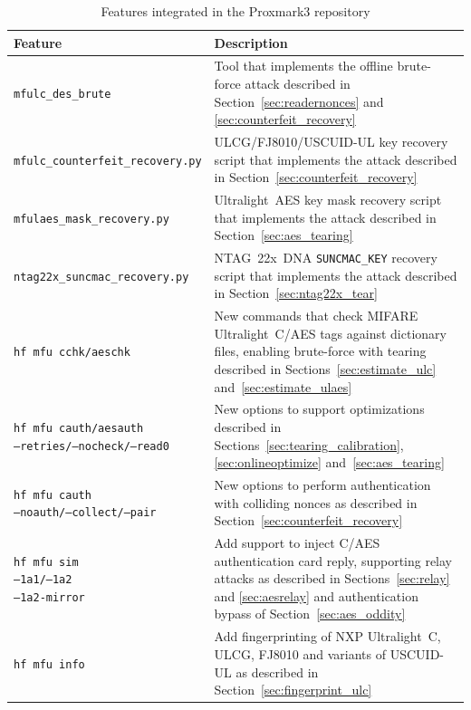 \documentclass[10pt,letterpaper]{article}
\begin{document}
\begin{table}[ht]
  \centering
  \caption{Features integrated in the Proxmark3 repository}
  \label{tab:pm3repo-contents}
  \begin{tabularx}{\textwidth}{|l|X|}
    \hline
    \textbf{Feature} & \textbf{Description} \\ \hline
    {\small \texttt{mfulc\_des\_brute}} & Tool that implements the offline brute-force attack described in Section~\ref{sec:readernonces} and \ref{sec:counterfeit_recovery} \\ \hline
    {\small \texttt{mfulc\_counterfeit\_recovery.py}} & ULCG/FJ8010/USCUID-UL key recovery script that implements the attack described in Section~\ref{sec:counterfeit_recovery} \\ \hline
    {\small \texttt{mfulaes\_mask\_recovery.py}} & Ultralight~AES key mask recovery script that implements the attack described in Section~\ref{sec:aes_tearing} \\ \hline
    {\small \texttt{ntag22x\_suncmac\_recovery.py}} & NTAG~22x~DNA \texttt{SUNCMAC\_KEY} recovery script that implements the attack described in Section~\ref{sec:ntag22x_tear} \\ \hline
    {\small \texttt{hf mfu cchk/aeschk}} & New commands that check MIFARE Ultralight~C/AES tags against dictionary files, enabling brute-force with tearing described in Sections~\ref{sec:estimate_ulc} and~\ref{sec:estimate_ulaes} \\ \hline
    \makecell[tl]{{\small \texttt{hf mfu cauth/aesauth}}\\{\small \texttt{--retries/--nocheck/--read0}}} & New options to support optimizations described in Sections~\ref{sec:tearing_calibration}, \ref{sec:onlineoptimize} and~\ref{sec:aes_tearing}\\ \hline
    \makecell[tl]{{\small \texttt{hf mfu cauth}}\\{\small \texttt{--noauth/--collect/--pair}}} & New options to perform authentication with colliding nonces as described in Section~\ref{sec:counterfeit_recovery}\\ \hline
    \makecell[tl]{{\small \texttt{hf mfu sim}}\\{\small \texttt{--1a1/--1a2}}\\{\small \texttt{--1a2-mirror}}} & Add support to inject C/AES authentication card reply, supporting relay attacks as described in Sections~\ref{sec:relay} and \ref{sec:aesrelay} and authentication bypass of Section~\ref{sec:aes_oddity} \\ \hline
    {\small \texttt{hf mfu info}} & Add fingerprinting of NXP Ultralight~C, ULCG, FJ8010 and variants of USCUID-UL as described in Section~\ref{sec:fingerprint_ulc}\\ \hline

\end{tabularx}
\end{table}
\end{document}
